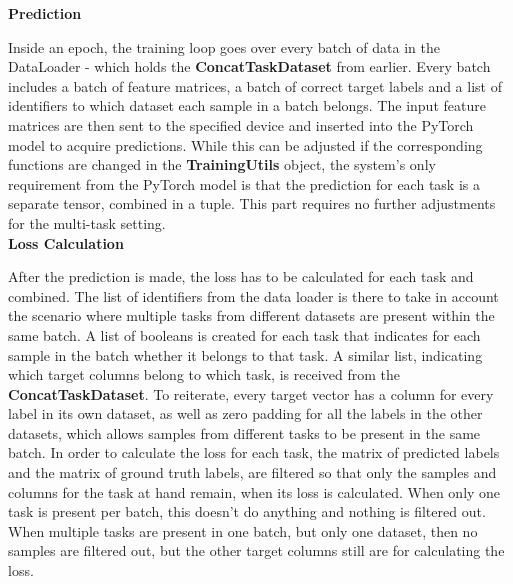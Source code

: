 \textbf{Prediction}

Inside an epoch, the training loop goes over every batch of data in the DataLoader - which holds the \textbf{ConcatTaskDataset} from earlier. Every batch includes a batch of feature matrices, a batch of correct target labels and a list of identifiers to which dataset each sample in a batch belongs. The input feature matrices are then sent to the specified device and inserted into the PyTorch model to acquire predictions. While this can be adjusted if the corresponding functions are changed in the \textbf{TrainingUtils} object, the system's only requirement from the PyTorch model is that the prediction for each task is a separate tensor, combined in a tuple. This part requires no further adjustments for the multi-task setting.\\

\textbf{Loss Calculation}

After the prediction is made, the loss has to be calculated for each task and combined. The list of identifiers from the data loader is there to take in account the scenario where multiple tasks from different datasets are present within the same batch. A list of booleans is created for each task that indicates for each sample in the batch whether it belongs to that task. A similar list, indicating which target columns belong to which task, is received from the \textbf{ConcatTaskDataset}. To reiterate, every target vector has a column for every label in its own dataset, as well as zero padding for all the labels in the other datasets, which allows samples from different tasks to be present in the same batch. In order to calculate the loss for each task, the matrix of predicted labels and the matrix of ground truth labels, are filtered so that only the samples and columns for the task at hand remain, when its loss is calculated. When only one task is present per batch, this doesn't do anything and nothing is filtered out. When multiple tasks are present in one batch, but only one dataset, then no samples are filtered out, but the other target columns still are for calculating the loss. \\

